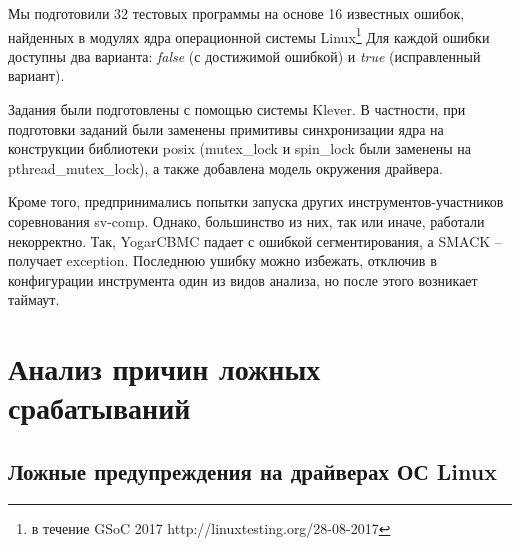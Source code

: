 







Мы подготовили 32 тестовых программы на основе 16 известных ошибок, найденных в модулях ядра операционной системы Linux\footnote{в течение GSoC 2017 http://linuxtesting.org/28-08-2017}
Для каждой ошибки доступны два варианта: {\em false} (с достижимой ошибкой) и {\em true} (исправленный вариант).

Задания были подготовлены с помощью системы Klever. В частности, при подготовки заданий были заменены примитивы синхронизации ядра на конструкции библиотеки posix (mutex\_lock и spin\_lock были заменены на pthread\_mutex\_lock), а также добавлена модель окружения драйвера.

Кроме того, предпринимались попытки запуска других инструментов-участников соревнования sv-comp. 
Однако, большинство из них, так или иначе, работали некорректно. 
Так, YogarCBMC падает с ошибкой сегментирования, а SMACK -- получает exception. Последнюю ушибку можно избежать, отключив в конфигурации инструмента один из видов анализа, но после этого возникает таймаут.


\section{Анализ причин ложных срабатываний}

\subsection{Ложные предупреждения на драйверах ОС Linux}

